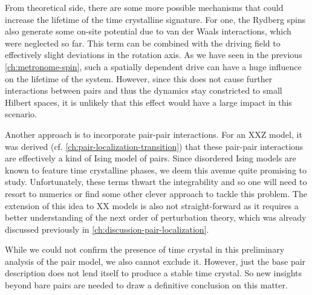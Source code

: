 From theoretical side, there are some more possible mechanisms that could increase the lifetime of the time crystalline signature. For one, the Rydberg spins also generate some on-site potential due to van der Waals interactions, which were neglected so far. This term can be combined with the driving field to effectively slight deviations in the rotation axis. As we have seen in the previous \autoref{ch:metronome-spin}, such a spatially dependent drive can have a huge influence on the lifetime of the system. However, since this does not cause further interactions between pairs and thus the dynamics stay constricted to small Hilbert spaces, it is unlikely that this effect would have a large impact in this scenario.

Another approach is to incorporate pair-pair interactions. For an XXZ model, it was derived (cf. \autoref{ch:pair-localization-transition}) that these pair-pair interactions are effectively a kind of Ising model of pairs. Since disordered Ising models are known to feature time crystalline phases, we deem this avenue quite promising to study. Unfortunately, these terms thwart the integrability and so one will need to resort to numerics or find some other clever approach to tackle this problem.
The extension of this idea to XX models is also not straight-forward as it requires a better understanding of the next order of perturbation theory, which was already discussed previously in \autoref{ch:discussion-pair-localization}.

While we could not confirm the presence of time crystal in this preliminary analysis of the pair model, we also cannot exclude it. However, just the base pair description does not lend itself to produce a stable time crystal. So new insights beyond bare pairs are needed to draw a definitive conclusion on this matter.

